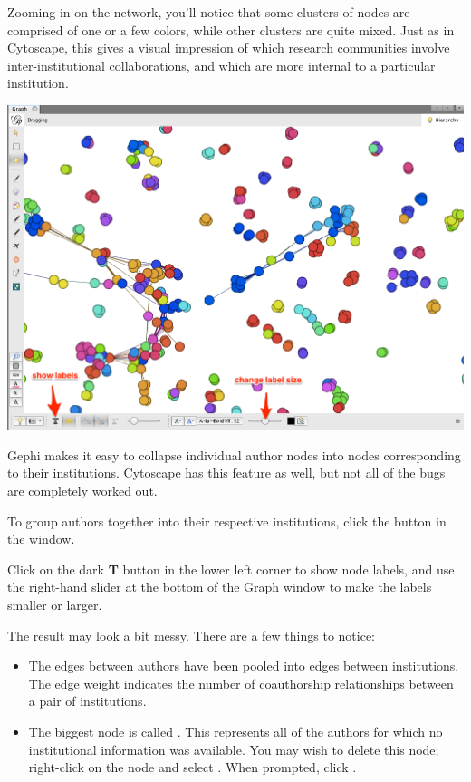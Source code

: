 \documentclass[letterpaper,10pt,english]{sphinxmanual}
\begin{document}
Zooming in on the network, you’ll notice that some clusters of nodes are comprised of one
or a few colors, while other clusters are quite mixed. Just as in Cytoscape, this gives a
visual impression of which research communities involve inter-institutional
collaborations, and which are more internal to a particular institution.

{\hfill\includegraphics{coauthors.27.png}\hfill}

Gephi makes it easy to collapse individual author nodes into nodes corresponding to their
institutions. Cytoscape has this feature as well, but not all of the bugs are completely
worked out.

To group authors together into their respective institutions, click the  button
in the  window.

Click on the dark \textbf{T} button in the lower left corner to show node labels, and use the
right-hand slider at the bottom of the Graph window to make the labels smaller or larger.

The result may look a bit messy. There are a few things to notice:
\begin{itemize}
\item {} 
The edges between authors have been pooled into edges between institutions. The edge
weight indicates the number of coauthorship relationships between a pair of
institutions.

\item {} 
The biggest node is called . This represents all of the authors for which no
institutional information was available. You may wish to delete this node; right-click
on the node and select . When prompted, click .

\end{itemize}
\end{document}
